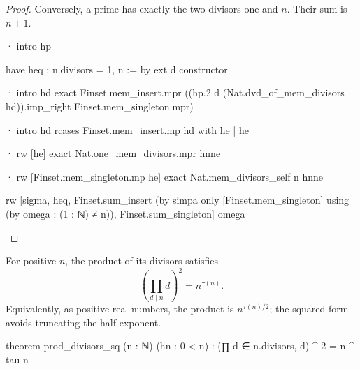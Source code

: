 \begin{proof}
  Conversely, a prime has exactly the two divisors one and $n$.
  Their sum is $n+1$.

  \begin{lean}
    · intro hp

      have heq : n.divisors = {1, n} := by
        ext d
        constructor

        · intro hd
          exact Finset.mem_insert.mpr ((hp.2 d (Nat.dvd_of_mem_divisors hd)).imp_right
            Finset.mem_singleton.mpr)

        · intro hd
          rcases Finset.mem_insert.mp hd with he | he

          · rw [he]
            exact Nat.one_mem_divisors.mpr hnne

          · rw [Finset.mem_singleton.mp he]
            exact Nat.mem_divisors_self n hnne

      rw [sigma, heq, Finset.sum_insert (by simpa only [Finset.mem_singleton] using
        (by omega : (1 : ℕ) ≠ n)), Finset.sum_singleton]
      omega
  \end{lean}
\end{proof}

\begin{theorem}
  \label{ent:thm:prod-divisors-sq}
  For positive $n$, the product of its divisors satisfies \[ \left(\prod_{d\mid n}d\right)^2=n^{\tau(n)}. \] Equivalently, as positive real numbers, the product is $n^{\tau(n)/2}$; the squared form avoids truncating the half-exponent.

  \begin{lean}
    theorem prod_divisors_sq (n : ℕ) (hn : 0 < n) :
        (∏ d ∈ n.divisors, d) ^ 2 = n ^ tau n
  \end{lean}
\end{theorem}

